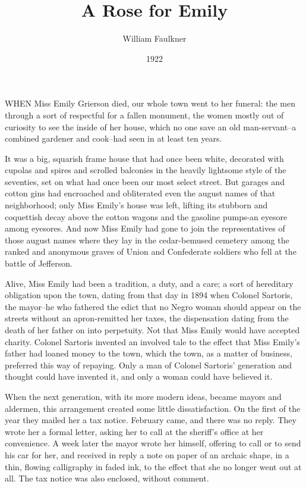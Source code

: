 \documentclass[10pt,a4paper]{article}
\newcommand{\glos}[3]{\dotuline{#1}\marginpar{\scriptsize\textit{#3} #2}}
\begin{document}
\title{A Rose for Emily}
\date{1922}
\author{William Faulkner}
\maketitle
    
\pagestyle{empty}
\thispagestyle{empty}
\linenumbers
WHEN Miss Emily Grierson died, our whole town went to her funeral: the men through a sort of respectful \glos{affection}{hengivelse}{subs.} for a fallen monument, the women mostly out of curiosity to see the inside of her house, which no one save an old man-servant--a combined gardener and cook--had seen in at least ten years.

It was a big, squarish frame house that had once been white, decorated with cupolas and spires and scrolled balconies in the heavily lightsome style of the seventies, set on what had once been our most select street. But garages and cotton gins had encroached and obliterated even the august names of that neighborhood; only Miss Emily's house was left, lifting its stubborn and coquettish decay above the cotton wagons and the gasoline pumps-an eyesore among eyesores. And now Miss Emily had gone to join the representatives of those august names where they lay in the cedar-bemused cemetery among the ranked and anonymous graves of Union and Confederate soldiers who fell at the battle of Jefferson.

Alive, Miss Emily had been a tradition, a duty, and a care; a sort of hereditary obligation upon the town, dating from that day in 1894 when Colonel Sartoris, the mayor--he who fathered the edict that no Negro woman should appear on the streets without an apron-remitted her taxes, the dispensation dating from the death of her father on into perpetuity. Not that Miss Emily would have accepted charity. Colonel Sartoris invented an involved tale to the effect that Miss Emily's father had loaned money to the town, which the town, as a matter of business, preferred this way of repaying. Only a man of Colonel Sartoris' generation and thought could have invented it, and only a woman could have believed it.

When the next generation, with its more modern ideas, became mayors and aldermen, this arrangement created some little dissatisfaction. On the first of the year they mailed her a tax notice. February came, and there was no reply. They wrote her a formal letter, asking her to call at the sheriff's office at her convenience. A week later the mayor wrote her himself, offering to call or to send his car for her, and received in reply a note on paper of an archaic shape, in a thin, flowing calligraphy in faded ink, to the effect that she no longer went out at all. The tax notice was also enclosed, without comment.
\end{document}
